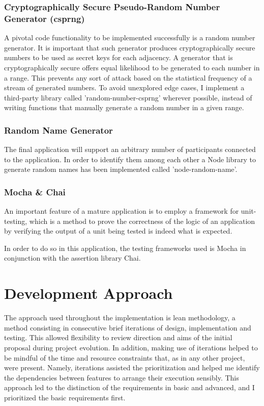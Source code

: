 \subsubsection{Cryptographically Secure Pseudo-Random Number Generator (csprng)} \label{sec:csprng}
A pivotal code functionality to be implemented successfully is a random number generator. It is important that such generator produces cryptographically secure numbers to be used as secret keys for each adjacency. A generator that is cryptographically secure offers equal likelihood to be generated to each number in a range. This prevents any sort of attack based on the statistical frequency of a stream of generated numbers. 
To avoid unexplored edge cases, I implement a third-party library called 'random-number-csprng' wherever possible, instead of writing functions that manually generate a random number in a given range.

\subsubsection{Random Name Generator}
The final application will support an arbitrary number of participants connected to the application. In order to identify them among each other a Node library to generate random names has been implemented called 'node-random-name'. 

\subsubsection{Mocha \& Chai} \label{sec:testingFrameworks}
An important feature of a mature application is to employ a framework for unit-testing, which is a method to prove the correctness of the logic of an application by verifying the output of a unit being tested is indeed what is expected.

In order to do so in this application, the testing frameworks used is Mocha in conjunction with the assertion library Chai. 


\section{Development Approach}
The approach used throughout the implementation is lean methodology, a method consisting in consecutive brief iterations of design, implementation and testing. This allowed flexibility to review direction and aims of the initial proposal during project evolution. In addition, making use of iterations helped to be mindful of the time and resource constraints that, as in any other project, were present. Namely, iterations assisted the prioritization and helped me identify the dependencies between features to arrange their execution sensibly. This approach led to the distinction of the requirements in basic and advanced, and I prioritized the basic requirements first.


